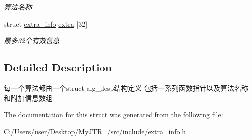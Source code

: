 \begin{DoxyCompactItemize}
\begin{DoxyCompactList}\small\item\em 算法名称 \end{DoxyCompactList}\item 
\mbox{\label{structalg__desp_a02eb817495fc1d08be8f4dbe1769f9e5}} 
struct \mbox{\hyperlink{structextra__info}{extra\+\_\+info}} \mbox{\hyperlink{structalg__desp_a02eb817495fc1d08be8f4dbe1769f9e5}{extra}} \mbox{[}32\mbox{]}
\begin{DoxyCompactList}\small\item\em 最多32个有效信息 \end{DoxyCompactList}\end{DoxyCompactItemize}


\subsection{Detailed Description}
每一个算法都由一个struct alg\+\_\+desp结构定义 包括一系列函数指针以及算法名称和附加信息数组 

The documentation for this struct was generated from the following file\+:\begin{DoxyCompactItemize}
\item 
C\+:/\+Users/user/\+Desktop/\+My\+J\+T\+R\+\_/src/include/\mbox{\hyperlink{extra__info_8h}{extra\+\_\+info.\+h}}\end{DoxyCompactItemize}
